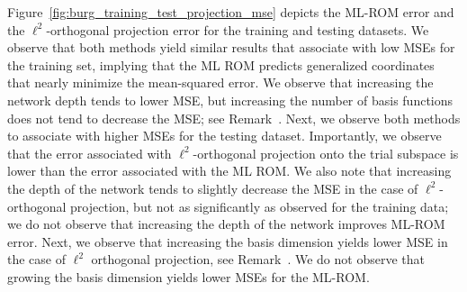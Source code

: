 \documentclass[3p,computermodern,10pt]{elsarticle}
\begin{document}
Figure~\ref{fig:burg_training_test_projection_mse} depicts the ML-ROM error and the $\ell^2$-orthogonal projection error for the training and testing datasets. We observe that both methods yield similar results that associate with low MSEs for the training set, implying that the ML ROM predicts generalized coordinates that nearly minimize the mean-squared error. We observe that increasing the network depth tends to lower MSE, but increasing the number of basis functions does not tend to decrease the MSE; see Remark~\cite{}. Next, we observe both methods to associate with higher MSEs for the testing dataset. Importantly, we observe that the error associated with $\ell^2$-orthogonal projection onto the trial subspace is lower than the error associated with the ML ROM. We also note that increasing the depth of the network tends to slightly decrease the MSE in the case of $\ell^2$-orthogonal projection, but not as significantly as observed for the training data; we do not observe that increasing the depth of the network improves ML-ROM error. Next, we observe that increasing the basis dimension yields lower MSE in the case of $\ell^2$ orthogonal projection, see Remark~\cite{}. We do not observe that growing the basis dimension yields lower MSEs for the ML-ROM.    
\end{document}
